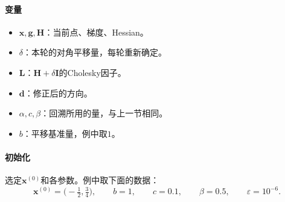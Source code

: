 \paragraph{变量}
\begin{itemize}
 \item $\bm{x},\bm{g},\bm{H}$：当前点、梯度、Hessian。
 \item $\delta$：本轮的对角平移量，每轮重新确定。
 \item $\bm{L}$：$\bm{H}+\delta\bm{I}$的Cholesky因子。
 \item $\bm{d}$：修正后的方向。
 \item $\alpha,c,\beta$：回溯所用的量，与上一节相同。
 \item $b$：平移基准量，例中取$1$。
\end{itemize}

\paragraph{初始化}
选定$\bm{x}^{(0)}$和各参数。例中取下面的数据：
\[
 \bm{x}^{(0)}=\bigl(-\tfrac12,\tfrac34\bigr),\qquad b=1,\qquad c=0.1,\qquad \beta=0.5,\qquad \varepsilon=10^{-6}.
\]

